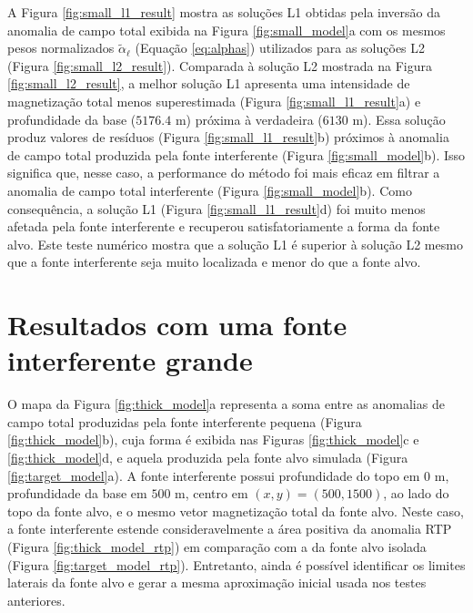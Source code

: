 A Figura \ref{fig:small_l1_result} mostra as soluções L1 obtidas pela inversão da anomalia de campo total exibida na Figura \ref{fig:small_model}a
com os mesmos pesos normalizados $\tilde{\alpha}_{\ell}$ (Equação \ref{eq:alphas})
utilizados para as soluções L2 (Figura \ref{fig:small_l2_result}).
Comparada à solução L2 mostrada na Figura \ref{fig:small_l2_result}, a melhor solução L1 apresenta uma intensidade de magnetização total menos superestimada (Figura 
\ref{fig:small_l1_result}a) e profundidade da base ($5176.4$ m) próxima à verdadeira ($6130$ m). Essa solução produz valores de resíduos (Figura \ref{fig:small_l1_result}b) 
próximos à anomalia de campo total produzida pela fonte interferente (Figura 
\ref{fig:small_model}b). 
Isso significa que, nesse caso, a performance do método foi mais eficaz em filtrar a anomalia de campo total interferente (Figura \ref{fig:small_model}b).
Como consequência, a solução L1 (Figura \ref{fig:small_l1_result}d) foi muito menos afetada pela fonte interferente e recuperou satisfatoriamente a forma da fonte alvo. 
Este teste numérico mostra que a solução L1 é superior à solução L2 mesmo que a fonte interferente seja muito localizada e menor do que a fonte alvo.

\section{Resultados com uma fonte interferente grande}
\label{sec:target_source_with_large_interference}

O mapa da Figura \ref{fig:thick_model}a representa a soma entre as anomalias de campo total produzidas pela fonte interferente pequena (Figura \ref{fig:thick_model}b), cuja forma é exibida nas Figuras \ref{fig:thick_model}c e \ref{fig:thick_model}d, e aquela produzida pela fonte alvo simulada (Figura \ref{fig:target_model}a).
A fonte interferente possui profundidade do topo em $0$ m, profundidade da base em $500$ m, 
centro em $(x, y) = (500, 1500)$, ao lado do topo da fonte alvo, e o mesmo vetor magnetização total da fonte alvo.
Neste caso, a fonte interferente estende consideravelmente a área positiva da anomalia RTP (Figura \ref{fig:thick_model_rtp}) em comparação com a da fonte alvo isolada (Figura \ref{fig:target_model_rtp}). Entretanto, ainda é possível identificar os limites laterais da fonte alvo e gerar a mesma aproximação inicial usada nos testes anteriores.



